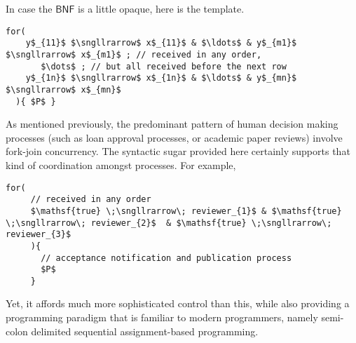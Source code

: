 
In case the $\mathsf{BNF}$ is a little opaque, here is the template.

\begin{lstlisting}[mathescape=true]
  for(
    y$_{11}$ $\sngllrarrow$ x$_{11}$ & $\ldots$ & y$_{m1}$ $\sngllrarrow$ x$_{m1}$ ; // received in any order, 
       $\dots$ ; // but all received before the next row
    y$_{1n}$ $\sngllrarrow$ x$_{1n}$ & $\ldots$ & y$_{mn}$ $\sngllrarrow$ x$_{mn}$
  ){ $P$ }
\end{lstlisting}

As mentioned previously, the predominant pattern of human decision
making processes (such as loan approval processes, or academic paper
reviews) involve fork-join concurrency. The syntactic sugar provided
here certainly supports that kind of coordination amongst processes. For example,

\begin{lstlisting}[mathescape=true]
  for(
     // received in any order
     $\mathsf{true} \;\sngllrarrow\; reviewer_{1}$ & $\mathsf{true} \;\sngllrarrow\; reviewer_{2}$  & $\mathsf{true} \;\sngllrarrow\; reviewer_{3}$ 
     ){
       // acceptance notification and publication process
       $P$
     } 
\end{lstlisting}

Yet, it affords much more sophisticated control than this, while also
providing a programming paradigm that is familiar to modern
programmers, namely semi-colon delimited sequential assignment-based
programming.
